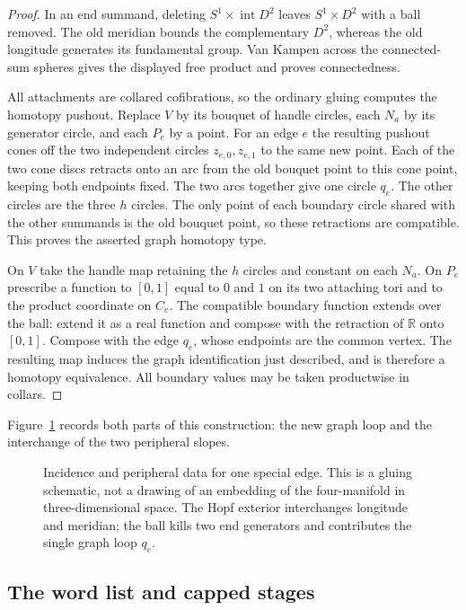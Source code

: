 \begin{proof}
In an end summand, deleting $S^1\times\operatorname{int}D^2$
leaves $S^1\times D^2$ with a ball removed.  The old meridian bounds
the complementary $D^2$, whereas the old longitude generates its
fundamental group.  Van Kampen across the connected-sum spheres gives
the displayed free product and proves connectedness.

All attachments are collared cofibrations, so the ordinary gluing
computes the homotopy pushout.  Replace $V$ by its bouquet of handle
circles, each $N_a$ by its generator circle, and each $P_e$ by a point.
For an edge $e$ the resulting pushout cones off the two independent
circles $z_{e,0},z_{e,1}$ to the same new point.  Each of the two cone
discs retracts onto an arc from the old bouquet point to this cone
point, keeping both endpoints fixed.  The two arcs together give one
circle $q_e$.  The other circles are the three $h$ circles.  The only point of each
boundary circle shared with the other summands is the old bouquet point, so these retractions are compatible.
This proves the asserted graph homotopy type.

On $V$ take the handle map retaining the $h$ circles and constant on
each $N_a$.  On $P_e$ prescribe a function to $[0,1]$ equal to $0$ and
$1$ on its two attaching tori and to the product coordinate on $C_e$.
The compatible boundary function extends over the ball: extend it as
a real function and compose with the retraction of $\mathbb R$ onto
$[0,1]$.  Compose with the edge $q_e$, whose endpoints are the common
vertex.  The resulting map induces the graph identification just
described, and is therefore a homotopy equivalence.  All boundary
values may be taken productwise in collars.
\end{proof}

Figure~\ref{geo:fig-graph} records both parts of this construction: the
new graph loop and the interchange of the two peripheral slopes.

\begin{figure}[!hb]
\centering

\caption{Incidence and peripheral data for one special edge.  This is
a gluing schematic, not a drawing of an embedding of the four-manifold
in three-dimensional space.  The Hopf exterior interchanges longitude
and meridian; the ball kills two end generators and contributes the
single graph loop $q_e$.}\label{geo:fig-graph}
\end{figure}

\subsection{The word list and capped stages}

